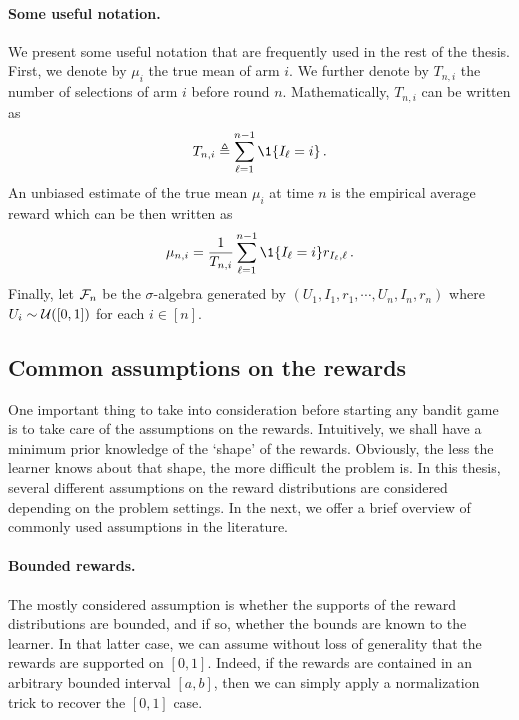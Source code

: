 \paragraph{Some useful notation.}
We present some useful notation that are frequently used in the rest of the thesis. First, we denote by $\mu_i$ the true mean of arm $i$. We further denote by $T_{n,i}$ the number of selections of arm $i$ before round $n$. Mathematically, $T_{n,i}$ can be written as
\begin{align}\label{eq:mab.pulls}
    T_{n,i}\eqdef\sum_{\ell=1}^{n-1} \1{\{ I_{\ell} = i \}}\,.
\end{align}
An unbiased estimate of the true mean $\mu_i$ at time $n$ is the empirical average reward which can be then written as
\begin{align}\label{eq:mab.empirical_mean}
    \mu_{n,i}  = \frac{1}{T_{n,i}} \sum_{\ell=1}^{n-1} \1\{I_\ell = i\}r_{I_\ell,\ell}\,.
\end{align}
Finally, let $\mathcal{F}_n$ be the $\sigma$-algebra generated by $(U_1,I_1,r_1,\cdots,U_n,I_n,r_n)$ where $U_i\sim\mathcal{U}([0,1])$ for each $i\in[n]$.

\subsection{Common assumptions on the rewards}\label{sec:mab.model.assumptions}

One important thing to take into consideration before starting any bandit game is to take care of the assumptions on the rewards. Intuitively, we shall have a minimum prior knowledge of the `shape' of the rewards. Obviously, the less the learner knows about that shape, the more difficult the problem is. In this thesis, several different assumptions on the reward distributions are considered depending on the problem settings. In the next, we offer a brief overview of commonly used assumptions in the literature.

\paragraph{Bounded rewards.}

The mostly considered assumption is whether the supports of the reward distributions are bounded, and if so, whether the bounds are known to the learner. In that latter case, we can assume without loss of generality that the rewards are supported on $[0,1]$. Indeed, if the rewards are contained in an arbitrary bounded interval $[a,b]$, then we can simply apply a normalization trick to recover the $[0,1]$ case.

